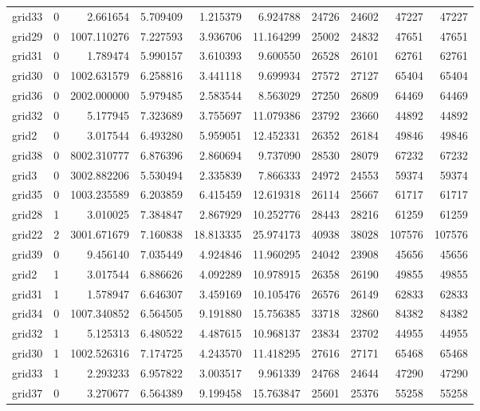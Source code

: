 \begin{longtable}{|l|r|r|r|r|r|r|r|r|r|}
grid33 & 0 & 2.661654 & 5.709409 & 1.215379 & 6.924788 & 24726 & 24602 & 47227 & 47227 \\
grid29 & 0 & 1007.110276 & 7.227593 & 3.936706 & 11.164299 & 25002 & 24832 & 47651 & 47651 \\
grid31 & 0 & 1.789474 & 5.990157 & 3.610393 & 9.600550 & 26528 & 26101 & 62761 & 62761 \\
grid30 & 0 & 1002.631579 & 6.258816 & 3.441118 & 9.699934 & 27572 & 27127 & 65404 & 65404 \\
grid36 & 0 & 2002.000000 & 5.979485 & 2.583544 & 8.563029 & 27250 & 26809 & 64469 & 64469 \\
grid32 & 0 & 5.177945 & 7.323689 & 3.755697 & 11.079386 & 23792 & 23660 & 44892 & 44892 \\
grid2 & 0 & 3.017544 & 6.493280 & 5.959051 & 12.452331 & 26352 & 26184 & 49846 & 49846 \\
grid38 & 0 & 8002.310777 & 6.876396 & 2.860694 & 9.737090 & 28530 & 28079 & 67232 & 67232 \\
grid3 & 0 & 3002.882206 & 5.530494 & 2.335839 & 7.866333 & 24972 & 24553 & 59374 & 59374 \\
grid35 & 0 & 1003.235589 & 6.203859 & 6.415459 & 12.619318 & 26114 & 25667 & 61717 & 61717 \\
grid28 & 1 & 3.010025 & 7.384847 & 2.867929 & 10.252776 & 28443 & 28216 & 61259 & 61259 \\
grid22 & 2 & 3001.671679 & 7.160838 & 18.813335 & 25.974173 & 40938 & 38028 & 107576 & 107576 \\
grid39 & 0 & 9.456140 & 7.035449 & 4.924846 & 11.960295 & 24042 & 23908 & 45656 & 45656 \\
grid2 & 1 & 3.017544 & 6.886626 & 4.092289 & 10.978915 & 26358 & 26190 & 49855 & 49855 \\
grid31 & 1 & 1.578947 & 6.646307 & 3.459169 & 10.105476 & 26576 & 26149 & 62833 & 62833 \\
grid34 & 0 & 1007.340852 & 6.564505 & 9.191880 & 15.756385 & 33718 & 32860 & 84382 & 84382 \\
grid32 & 1 & 5.125313 & 6.480522 & 4.487615 & 10.968137 & 23834 & 23702 & 44955 & 44955 \\
grid30 & 1 & 1002.526316 & 7.174725 & 4.243570 & 11.418295 & 27616 & 27171 & 65468 & 65468 \\
grid33 & 1 & 2.293233 & 6.957822 & 3.003517 & 9.961339 & 24768 & 24644 & 47290 & 47290 \\
grid37 & 0 & 3.270677 & 6.564389 & 9.199458 & 15.763847 & 25601 & 25376 & 55258 & 55258 \\

\end{longtable}
